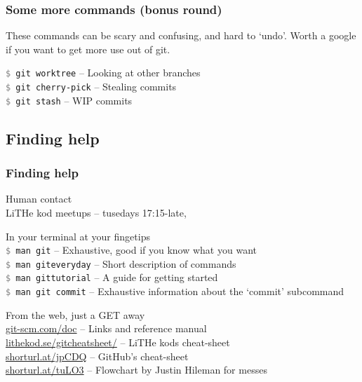 \documentclass{beamer}
\newcommand{\command}[1]{\texttt{\textcolor{gray}{\$} {#1}}}
\begin{document}
\begin{frame}[fragile]
  \frametitle{Some more commands (bonus round)}
  These commands can be scary and confusing, and hard to `undo'. Worth a google if you
  want to get more use out of git.
  \vspace{1em}
  
  \command{git worktree} -- Looking at other branches \\
  \command{git cherry-pick} -- Stealing commits \\
  \command{git stash} -- WIP commits \\
    
\end{frame}

\subsection{Finding help}

\begin{frame}[fragile]
  \frametitle{Finding help}

  Human contact \\
  \hspace{1em} LiTHe kod meetups -- tusedays 17:15-late,  \\
  \vspace{1em}

  In your terminal at your fingetips \\
  \hspace{1em} \command{man git} -- Exhaustive, good if you know what you want \\
  \hspace{1em} \command{man giteveryday} -- Short description of commands \\
  \hspace{1em} \command{man gittutorial} -- A guide for getting started \\
  \hspace{1em} \command{man git commit} -- Exhaustive information about the `commit' subcommand\\
  \vspace{1em}

  From the web, just a GET away \\
  \hspace{1em} \url{git-scm.com/doc} -- Links and reference manual \\
  \hspace{1em} \url{lithekod.se/gitcheatsheet/} -- LiTHe kods cheat-sheet \\
  \hspace{1em} \url{shorturl.at/jpCDQ} -- GitHub's cheat-sheet \\
  \hspace{1em} \url{shorturl.at/tuLO3} -- Flowchart by Justin Hileman for messes\\

\end{frame}
\end{document}
